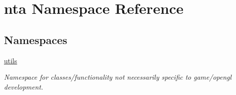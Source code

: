 \hypertarget{namespacenta}{}\section{nta Namespace Reference}
\label{namespacenta}
\subsection*{Namespaces}
\begin{DoxyCompactItemize}
\item 
 \hyperlink{namespacenta_1_1utils}{utils}
\begin{DoxyCompactList}\small\item\em Namespace for classes/functionality not necessarily specific to game/opengl development. \end{DoxyCompactList}\end{DoxyCompactItemize}
